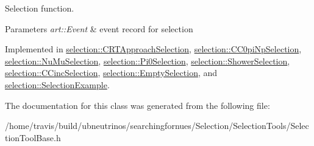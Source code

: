 Selection function. 


\begin{DoxyParams}{Parameters}
{\em art\-::\-Event} & event record for selection \\
\hline
\end{DoxyParams}


Implemented in \hyperlink{classselection_1_1CRTApproachSelection_a9dffc74d919ac0586d57c1de740f4ce9}{selection\-::\-C\-R\-T\-Approach\-Selection}, \hyperlink{classselection_1_1CC0piNpSelection_aee88d296a2ebad59acadfd919139d96f}{selection\-::\-C\-C0pi\-Np\-Selection}, \hyperlink{classselection_1_1NuMuSelection_ad9aaf5eedf311e33cb6e7f54e2605c98}{selection\-::\-Nu\-Mu\-Selection}, \hyperlink{classselection_1_1Pi0Selection_a1efba82b7ec3c2e18a48a98605720009}{selection\-::\-Pi0\-Selection}, \hyperlink{classselection_1_1ShowerSelection_aa538b905ab6e8a329acf3eaa97cc0af9}{selection\-::\-Shower\-Selection}, \hyperlink{classselection_1_1CCincSelection_ae8555674551f611dee06dc315ac2987f}{selection\-::\-C\-Cinc\-Selection}, \hyperlink{classselection_1_1EmptySelection_a4ecce282e53d9d7c6c4764eef0b808f7}{selection\-::\-Empty\-Selection}, and \hyperlink{classselection_1_1SelectionExample_a25a0971c86e5b6fb2ce51c16c0a58f9e}{selection\-::\-Selection\-Example}.



The documentation for this class was generated from the following file\-:\begin{DoxyCompactItemize}
\item 
/home/travis/build/ubneutrinos/searchingfornues/\-Selection/\-Selection\-Tools/Selection\-Tool\-Base.\-h\end{DoxyCompactItemize}

